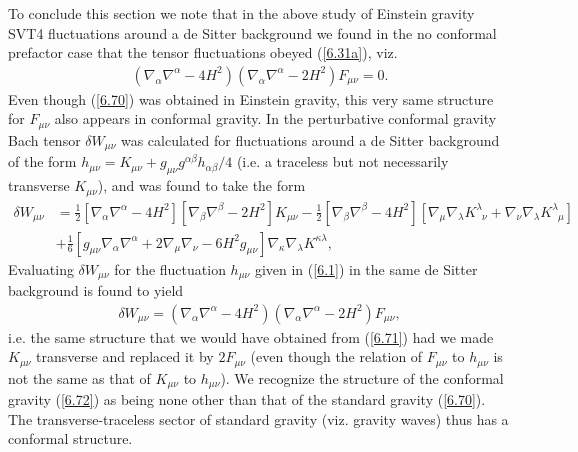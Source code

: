 \documentclass[aps,onecolumn,10pt]{revtex4}
\numberwithin{equation}{section}
\numberwithin{equation}{section}
\begin{document}
To conclude this section we note that in the above study of Einstein gravity SVT4 fluctuations around a de Sitter background we found in the no conformal prefactor case that the tensor fluctuations obeyed (\ref{6.31a}), viz.  
%
\begin{eqnarray}
(\nabla_{\alpha}\nabla^{\alpha}-4H^2)(\nabla_{\alpha}\nabla^{\alpha}-2H^2)F_{\mu\nu}=0.
\label{6.70}
\end{eqnarray}
%
Even though (\ref{6.70}) was obtained in Einstein gravity, this very same structure for $F_{\mu\nu}$ also appears in conformal gravity. In \cite{Mannheim2012a}  the perturbative conformal gravity Bach tensor $\delta W_{\mu\nu}$ was calculated for fluctuations around a de Sitter background of the form $h_{\mu\nu}=K_{\mu\nu}+g_{\mu\nu}g^{\alpha\beta}h_{\alpha\beta}/4$ (i.e. a traceless but not necessarily transverse $K_{\mu\nu}$), and was found to take the  form
%
\begin{align}
\delta W_{\mu\nu}&=\frac{1}{2}[\nabla_{\alpha}\nabla^{\alpha}-4H^2][\nabla_{\beta}\nabla^{\beta}-2H^2]K_{\mu\nu}
-\frac{1}{2}[\nabla_{\beta}\nabla^{\beta}-4H^2][
\nabla_{\mu}\nabla_{\lambda}K^{\lambda}_{\phantom{\lambda}\nu}
+\nabla_{\nu}\nabla_{\lambda}K^{\lambda}_{\phantom{\lambda}\mu}]
\nonumber\\
&+\frac{1}{6}[g_{\mu\nu}\nabla_{\alpha}\nabla^{\alpha}+2\nabla_{\mu}\nabla_{\nu}
-6H^2g_{\mu\nu}]\nabla_{\kappa}\nabla_{\lambda}K^{\kappa\lambda},
\label{6.71}
\end{align}
%
Evaluating $\delta W_{\mu\nu}$ for the fluctuation $h_{\mu\nu}$ given in (\ref{6.1}) in the same de Sitter background is found to yield 
\begin{eqnarray}
\delta W_{\mu\nu}= (\nabla_{\alpha}\nabla^{\alpha}-4H^2)(\nabla_{\alpha}\nabla^{\alpha}-2H^2)F_{\mu\nu},
\label{6.72}
\end{eqnarray}
%
i.e. the same structure that we would have obtained from (\ref{6.71}) had we made $K_{\mu\nu}$ transverse and replaced it by $2F_{\mu\nu}$ (even though the relation of $F_{\mu\nu}$ to  $h_{\mu\nu}$ is not the same as that of $K_{\mu\nu}$ to $h_{\mu\nu}$). We recognize the structure of the conformal gravity (\ref{6.72}) as being none other than that of the standard gravity (\ref{6.70}). The transverse-traceless sector of standard gravity (viz. gravity waves) thus has a conformal structure.
\end{document}
